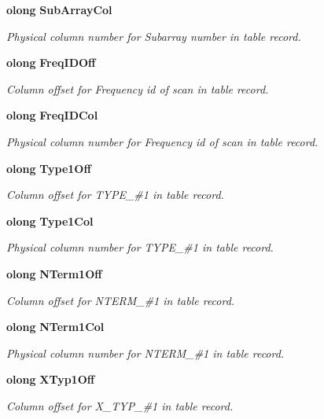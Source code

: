 \begin{CompactItemize}
{\bf olong} {\bf Sub\-Array\-Col}
\begin{CompactList}\small\item\em Physical column number for Subarray number in table record. \item\end{CompactList}\item 
{\bf olong} {\bf Freq\-IDOff}
\begin{CompactList}\small\item\em Column offset for Frequency id of scan in table record. \item\end{CompactList}\item 
{\bf olong} {\bf Freq\-IDCol}
\begin{CompactList}\small\item\em Physical column number for Frequency id of scan in table record. \item\end{CompactList}\item 
{\bf olong} {\bf Type1Off}
\begin{CompactList}\small\item\em Column offset for TYPE\_\-\#1 in table record. \item\end{CompactList}\item 
{\bf olong} {\bf Type1Col}
\begin{CompactList}\small\item\em Physical column number for TYPE\_\-\#1 in table record. \item\end{CompactList}\item 
{\bf olong} {\bf NTerm1Off}
\begin{CompactList}\small\item\em Column offset for NTERM\_\-\#1 in table record. \item\end{CompactList}\item 
{\bf olong} {\bf NTerm1Col}
\begin{CompactList}\small\item\em Physical column number for NTERM\_\-\#1 in table record. \item\end{CompactList}\item 
{\bf olong} {\bf XTyp1Off}
\begin{CompactList}\small\item\em Column offset for X\_\-TYP\_\-\#1 in table record. \item\end{CompactList}\item 

\end{CompactItemize}
